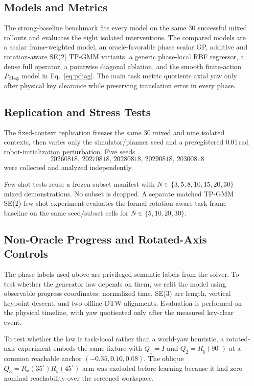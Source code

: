 \documentclass[letterpaper,10pt,conference]{ieeeconf}
\begin{document}
\subsection{Models and Metrics}

The strong-baseline benchmark fits every model on the same 30 successful mixed
rollouts and evaluates the eight isolated interventions. The compared models
are a scalar frame-weighted model, an oracle-favorable phase scalar GP, additive
and rotation-aware SE(2) TP-GMM variants, a generic phase-local RBF regressor, a
dense full operator, a pointwise diagonal ablation, and the smooth finite-action
$P_{\rm diag}$ model in Eq.~\eqref{eq:pdiag}. The main task metric quotients
axial yaw only after physical key clearance while preserving translation error
in every phase.

\subsection{Replication and Stress Tests}

The fixed-context replication freezes the same 30 mixed and nine isolated
contexts, then varies only the simulator/planner seed and a preregistered
0.01\,rad robot-initialization perturbation. Five seeds
\[
20260818,\,20270818,\,20280818,\,20290818,\,20300818
\]
were collected and analyzed independently.

Few-shot tests reuse a frozen subset manifest with
$N\in\{3,5,8,10,15,20,30\}$ mixed demonstrations. No subset is dropped. A
separate matched TP-GMM SE(2) few-shot experiment evaluates the formal
rotation-aware task-frame baseline on the same seed/subset cells for
$N\in\{5,10,20,30\}$.

\subsection{Non-Oracle Progress and Rotated-Axis Controls}

The phase labels used above are privileged semantic labels from the solver. To
test whether the generator law depends on them, we refit the model using
observable progress coordinates: normalized time, SE(3) arc length, vertical
keypoint descent, and two offline DTW alignments. Evaluation is performed on
the physical timeline, with yaw quotiented only after the measured key-clear
event.

To test whether the law is task-local rather than a world-yaw heuristic, a
rotated-axis experiment embeds the same fixture with
$Q_1=I$ and $Q_2=R_y(90^\circ)$ at a common reachable anchor
$(-0.35,0.10,0.08)$. The oblique $Q_3=R_x(35^\circ)R_y(45^\circ)$ arm was
excluded before learning because it had zero nominal reachability over the
screened workspace.
\end{document}
